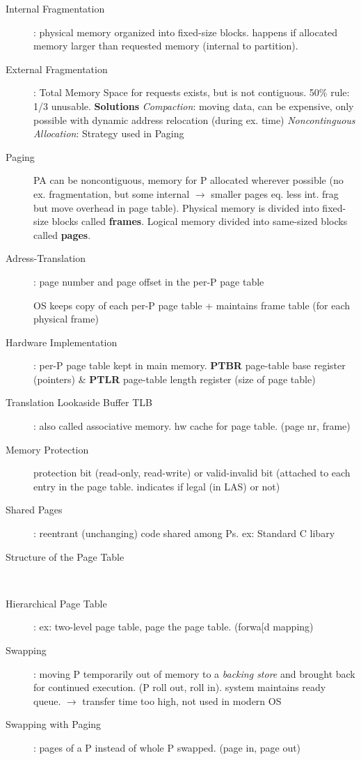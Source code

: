 \begin{description}
    \item[Internal Fragmentation]: physical memory organized into fixed-size blocks. happens if allocated memory larger than requested memory (internal to partition). \\
    \item[External Fragmentation]: Total Memory Space for requests exists, but is not contiguous. 50\% rule: 1/3 unusable. \textbf{Solutions} \textit{Compaction}: moving data, can be expensive, only possible with dynamic address relocation (during ex. time) \textit{Noncontinguous Allocation}: Strategy used in Paging \\
    \item[Paging] PA can be noncontiguous, memory for P allocated wherever possible (no ex. fragmentation, but some internal $\rightarrow$ smaller pages eq. less int. frag but move overhead in page table). Physical memory is divided into fixed-size blocks called \textbf{frames}. Logical memory divided into same-sized blocks called \textbf{pages}.\\
    \item[Adress-Translation]: page number and page offset in the per-P page table
    \item[] OS keeps copy of each per-P page table + maintains frame table (for each physical frame)
    \item[Hardware Implementation]: per-P page table kept in main memory. \textbf{PTBR} page-table base register (pointers) \& \textbf{PTLR} page-table length register (size of page table)
    \item[Translation Lookaside Buffer TLB]: also called associative memory. hw cache for page table. (page nr, frame)
    \item[Memory Protection] protection bit (read-only, read-write) or valid-invalid bit (attached to each entry in the page table. indicates if legal (in LAS) or not)
    \item[Shared Pages]: reentrant (unchanging) code shared among Ps. ex: Standard C libary
    \item[Structure of the Page Table] \\
    \item[Hierarchical Page Table]: ex: two-level page table, page the page table. (forwa[d mapping) \\
    \item[Swapping]: moving P temporarily out of memory to a \textit{backing store} and brought back for continued execution. (P roll out, roll in). system maintains ready queue. $\rightarrow$ transfer time too high, not used in modern OS  \\
    \item[Swapping with Paging]: pages of a P instead of whole P swapped. (page in, page out)
\end{description}
